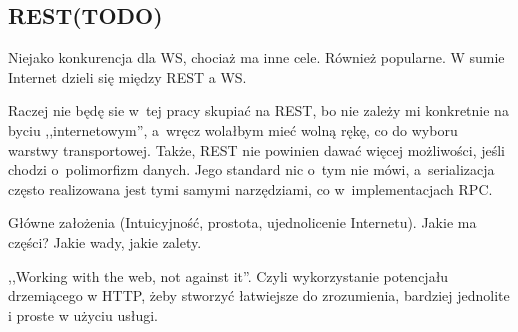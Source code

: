 %
%

\subsection{REST(TODO)}
Niejako konkurencja dla WS, chociaż ma inne cele. Również popularne. W sumie Internet dzieli się między REST a WS.

Raczej nie będę sie w~tej pracy skupiać na REST, bo nie zależy mi konkretnie na byciu ,,internetowym'', a~wręcz wolałbym mieć wolną rękę, co do wyboru warstwy transportowej. Także, REST nie powinien dawać więcej możliwości, jeśli chodzi o~polimorfizm danych. Jego standard nic o~tym nie mówi, a~serializacja często realizowana jest tymi samymi narzędziami, co w~implementacjach RPC.

Główne założenia (Intuicyjność, prostota, ujednolicenie Internetu). Jakie ma części? Jakie wady, jakie zalety.

,,Working with the web, not against it''. Czyli wykorzystanie potencjału drzemiącego w HTTP, żeby stworzyć łatwiejsze do zrozumienia, bardziej jednolite i proste w użyciu usługi.

%
%
%
%

